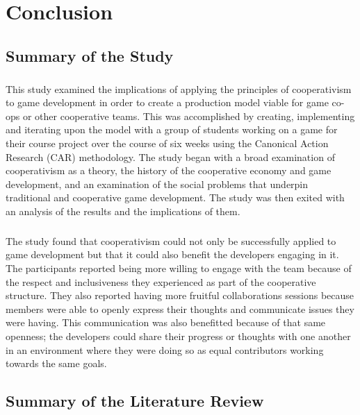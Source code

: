 \chapter{Conclusion}

\section{Summary of the Study}

\paragraph{} This study examined the implications of applying the principles of cooperativism to game development in order to create a production model viable for game co-ops or other cooperative teams. This was accomplished by creating, implementing and iterating upon the model with a group of students working on a game for their course project over the course of six weeks using the Canonical Action Research (CAR) methodology. The study began with a broad examination of cooperativism as a theory, the history of the cooperative economy and game development, and an examination of the social problems that underpin traditional and cooperative game development. The study was then exited with an analysis of the results and the implications of them.

\paragraph{} The study found that cooperativism could not only be successfully applied to game development but that it could also benefit the developers engaging in it. The participants reported being more willing to engage with the team because of the respect and inclusiveness they experienced as part of the cooperative structure. They also reported having more fruitful collaborations sessions because members were able to openly express their thoughts and communicate issues they were having. This communication was also benefitted because of that same openness; the developers could share their progress or thoughts with one another in an environment where they were doing so as equal contributors working towards the same goals.

\section{Summary of the Literature Review}

